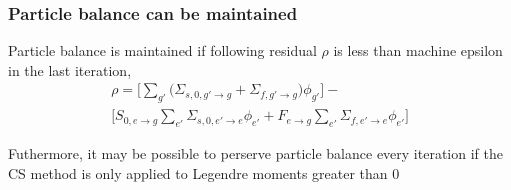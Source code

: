 \documentclass[xcolor=dvipsnames]{beamer}
\begin{document}
\begin{frame}
\frametitle{Particle balance can be maintained}
Particle balance is maintained if following residual $\rho$ is less than machine epsilon in the last iteration,
\begin{multline*}
\label{eq:scatter}
\rho = \Big[ \sum_{g'}  \big( \Sigma_{s,0,g'\to g} + \Sigma_{f,g' \to g} \big)  \phi_{g'} \Big] - \\ \Big[ S_{0,e\to g} \sum_{e'} \Sigma_{s,0,e'\to e} \phi_{e'} + F_{e\to g} \sum_{e'}  \Sigma_{f,e' \to e} \phi_{e'} \Big] 
\end{multline*}

Futhermore, it may be possible to perserve particle balance every iteration if the CS method is only applied to Legendre moments greater than 0
\end{frame}
\end{document}
